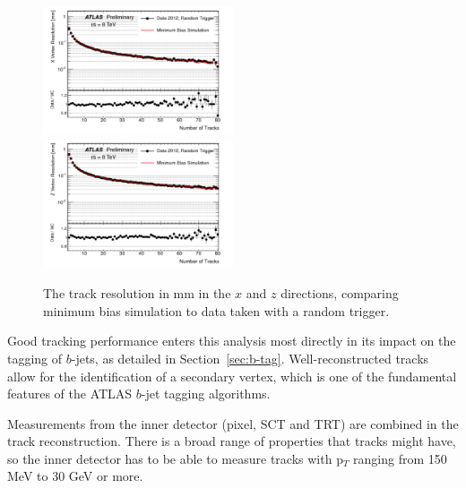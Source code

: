 \begin{figure}
	\includegraphics[width=0.5\textwidth]{ReconstructionPerformance/images/track_perf3.pdf}
	\includegraphics[width=0.5\textwidth]{ReconstructionPerformance/images/track_perf4.pdf}
	\caption{The track resolution in mm in the $x$ and $z$ directions, comparing minimum bias simulation to data taken with a random trigger. \label{fig:track_perfB}}
\end{figure}

Good tracking performance enters this analysis most directly in its impact on the tagging of $b$-jets, as detailed in Section~\ref{sec:b-tag}.  Well-reconstructed tracks allow for the identification of a secondary vertex, which is one of the fundamental features of the ATLAS $b$-jet tagging algorithms.


Measurements from the inner detector (pixel, SCT and TRT) are combined in the track reconstruction.  There is a broad range 
of properties that tracks might have, so the inner detector has to be able to measure tracks with p$_T$
 ranging from 150 MeV to 30 GeV or more.   

